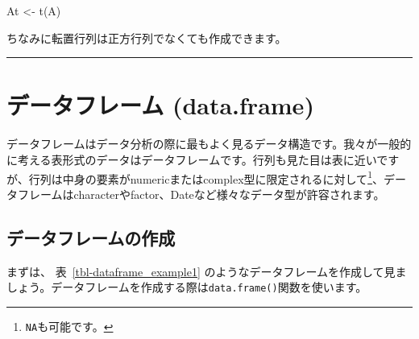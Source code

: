 \documentclass[
  a4paper,
  pandoc,
  ja=standard,
  jafont=haranoaji]{bxjsbook}
\newenvironment{Shaded}{\begin{snugshade}}{\end{snugshade}}
\newcommand{\FunctionTok}[1]{\textcolor[rgb]{0.28,0.35,0.67}{#1}}
\newcommand{\NormalTok}[1]{\textcolor[rgb]{0.00,0.48,0.65}{#1}}
\newcommand{\OtherTok}[1]{\textcolor[rgb]{0.00,0.48,0.65}{#1}}
\begin{document}
\begin{Shaded}
\begin{Highlighting}[numbers=left,,]
\NormalTok{At }\OtherTok{\textless{}{-}} \FunctionTok{t}\NormalTok{(A)}
\end{Highlighting}
\end{Shaded}

ちなみに転置行列は正方行列でなくても作成できます。

\begin{center}\rule{0.5\linewidth}{0.5pt}\end{center}

\hypertarget{sec-datastructure_dataframe}{%
\section{データフレーム
(data.frame)}\label{sec-datastructure_dataframe}}

データフレームはデータ分析の際に最もよく見るデータ構造です。我々が一般的に考える表形式のデータはデータフレームです。行列も見た目は表に近いですが、行列は中身の要素がnumericまたはcomplex型に限定されるに対して\footnote{\texttt{NA}も可能です。}、データフレームはcharacterやfactor、Dateなど様々なデータ型が許容されます。

\hypertarget{ux30c7ux30fcux30bfux30d5ux30ecux30fcux30e0ux306eux4f5cux6210}{%
\subsection{データフレームの作成}\label{ux30c7ux30fcux30bfux30d5ux30ecux30fcux30e0ux306eux4f5cux6210}}

まずは、 表~\ref{tbl-dataframe_example1}
のようなデータフレームを作成して見ましょう。データフレームを作成する際は\texttt{data.frame()}関数を使います。

\begin{table}

\caption{\label{tbl-dataframe_example1}\textbf{?(caption)}}\begin{minipage}[t]{\linewidth}
\subcaption{\label{tbl-dataframe_example1-1}}

{\centering 


}

\end{minipage}%

\end{table}
\end{document}
